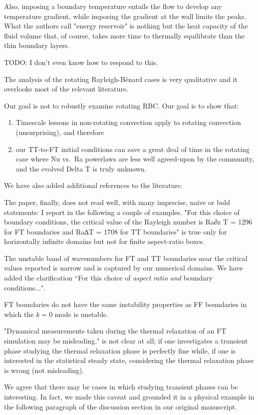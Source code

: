 \documentclass[aps, 11pt, singlecolumn]{revtex4-1} %
\begin{document}
\begin{singlespace}
\begin{myquotation}
Also, imposing a boundary temperature entails the flow to develop any temperature gradient, while imposing the gradient at the wall limits the peaks. 
What the authors call "energy reservoir" is nothing but the heat capacity of the fluid volume that, of course, takes more time to thermally equilibrate than the thin boundary layers.
\end{myquotation}
TODO: I don't even know how to respond to this.

\begin{myquotation}
The analysis of the rotating Rayleigh-B\'{e}nard cases is very qualitative and it overlooks most of the relevant literature.
\end{myquotation}
Our goal is not to robustly examine rotating RBC.
Our goal is to show that:
\begin{enumerate}
\item Timescale lessons in non-rotating convection apply to rotating convection (unsurprising), and therefore
\item our TT-to-FT initial conditions can save a great deal of time in the rotating case where Nu vs.~Ra powerlaws are less well agreed-upon by the community, and the evolved Delta T is truly unknown.
\end{enumerate}
We have also added additional references to the literature.

\begin{myquotation}
The paper, finally, does not read well, with many imprecise, naive or bold statements: I report in the following a couple of examples. 
"For this choice of boundary conditions, the critical value of the Rayleigh number is Ra∂z T = 1296 for FT boundaries and Ra∆T = 1708 for TT boundaries" is true only for horizontally infinite domains but not for finite aspect-ratio boxes.
\end{myquotation}
The unstable band of wavenumbers for FT and TT boundaries near the critical values reported is narrow and is captured by our numerical domains.
We have added the clarification ``For this choice of \emph{aspect ratio and} boundary conditions...".

FT boundaries do not have the same instability properties as FF boundaries in which the $k = 0$ mode is unstable.

\begin{myquotation}
"Dynamical measurements taken during the thermal relaxation of an FT simulation may be misleading." is not clear at all; if one investigates a transient phase studying the thermal relaxation phase is perfectly fine while, if one is interested in the statistical steady state, considering the thermal relaxation phase is wrong (not misleading). 
\end{myquotation}
We agree that there may be cases in which studying transient phases can be interesting.
In fact, we made this caveat and grounded it in a physical example in the following paragraph of the discussion section in our original manuscript.


\end{singlespace}
\end{document}
